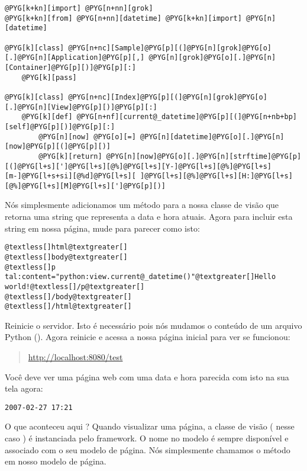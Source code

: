 \documentclass[a4paper,12pt,portuguese]{manual}
\begin{document}
\begin{Verbatim}[commandchars=@\[\]]
@PYG[k+kn][import] @PYG[n+nn][grok]
@PYG[k+kn][from] @PYG[n+nn][datetime] @PYG[k+kn][import] @PYG[n][datetime]

@PYG[k][class] @PYG[n+nc][Sample]@PYG[p][(]@PYG[n][grok]@PYG[o][.]@PYG[n][Application]@PYG[p][,] @PYG[n][grok]@PYG[o][.]@PYG[n][Container]@PYG[p][)]@PYG[p][:]
    @PYG[k][pass]

@PYG[k][class] @PYG[n+nc][Index]@PYG[p][(]@PYG[n][grok]@PYG[o][.]@PYG[n][View]@PYG[p][)]@PYG[p][:]    
    @PYG[k][def] @PYG[n+nf][current@_datetime]@PYG[p][(]@PYG[n+nb+bp][self]@PYG[p][)]@PYG[p][:]
        @PYG[n][now] @PYG[o][=] @PYG[n][datetime]@PYG[o][.]@PYG[n][now]@PYG[p][(]@PYG[p][)]
        @PYG[k][return] @PYG[n][now]@PYG[o][.]@PYG[n][strftime]@PYG[p][(]@PYG[l+s][']@PYG[l+s][@%]@PYG[l+s][Y-]@PYG[l+s][@%]@PYG[l+s][m-]@PYG[l+s+si][@%d]@PYG[l+s][ ]@PYG[l+s][@%]@PYG[l+s][H:]@PYG[l+s][@%]@PYG[l+s][M]@PYG[l+s][']@PYG[p][)]
\end{Verbatim}

Nós simplesmente adicionamos um método para a nossa classe de visão que
retorna uma string que representa a data e hora atuais. Agora para
incluir esta string em nossa página, mude  para parecer
como isto:

\begin{Verbatim}[commandchars=@\[\]]
@textless[]html@textgreater[]
@textless[]body@textgreater[]
@textless[]p tal:content="python:view.current@_datetime()"@textgreater[]Hello world!@textless[]/p@textgreater[]
@textless[]/body@textgreater[]
@textless[]/html@textgreater[]
\end{Verbatim}

Reinicie o servidor. Isto é necessário pois nós mudamos o conteúdo de
um arquivo Python (). Agora reinicie e acessa a nossa página inicial
para ver se funcionou:
\begin{quote}

\href{http://localhost:8080/test}{http://localhost:8080/test}
\end{quote}

Você deve ver uma página web com uma data e hora parecida com isto na
sua tela agora:

\begin{Verbatim}[commandchars=@\[\]]
2007-02-27 17:21
\end{Verbatim}

O que aconteceu aqui ? Quando visualizar uma página, a classe de
visão ( nesse caso  ) é instanciada pelo framework. O
nome  no modelo é sempre disponível e associado com o seu
modelo de página. Nós simplesmente chamamos o método em nosso modelo
de página.
\end{document}
